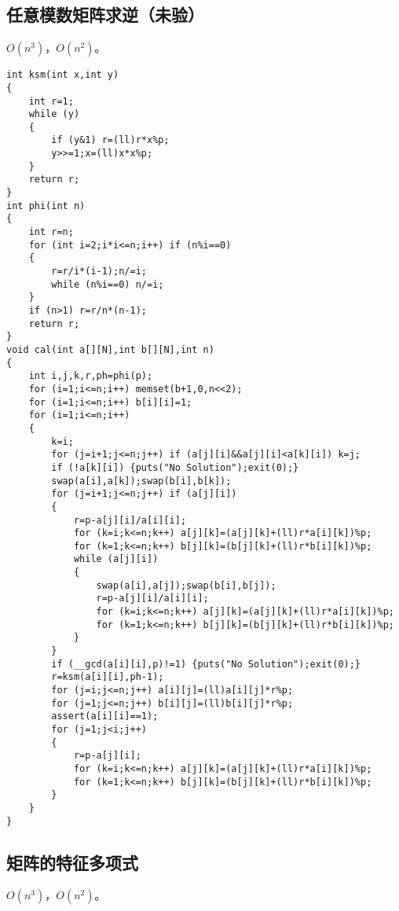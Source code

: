 \documentclass[12pt]{ctexart}
\begin{document}
\subsection{任意模数矩阵求逆（未验）}

$O(n^3)$，$O(n^2)$。

\begin{lstlisting}
int ksm(int x,int y)
{
	int r=1;
	while (y)
	{
		if (y&1) r=(ll)r*x%p;
		y>>=1;x=(ll)x*x%p;
	}
	return r;
}
int phi(int n)
{
	int r=n;
	for (int i=2;i*i<=n;i++) if (n%i==0)
	{
		r=r/i*(i-1);n/=i;
		while (n%i==0) n/=i;
	}
	if (n>1) r=r/n*(n-1);
	return r;
}
void cal(int a[][N],int b[][N],int n)
{
	int i,j,k,r,ph=phi(p);
	for (i=1;i<=n;i++) memset(b+1,0,n<<2);
	for (i=1;i<=n;i++) b[i][i]=1;
	for (i=1;i<=n;i++)
	{
		k=i;
		for (j=i+1;j<=n;j++) if (a[j][i]&&a[j][i]<a[k][i]) k=j;
		if (!a[k][i]) {puts("No Solution");exit(0);}
		swap(a[i],a[k]);swap(b[i],b[k]);
		for (j=i+1;j<=n;j++) if (a[j][i])
		{
			r=p-a[j][i]/a[i][i];
			for (k=i;k<=n;k++) a[j][k]=(a[j][k]+(ll)r*a[i][k])%p;
			for (k=1;k<=n;k++) b[j][k]=(b[j][k]+(ll)r*b[i][k])%p;
			while (a[j][i])
			{
				swap(a[i],a[j]);swap(b[i],b[j]);
				r=p-a[j][i]/a[i][i];
				for (k=i;k<=n;k++) a[j][k]=(a[j][k]+(ll)r*a[i][k])%p;
				for (k=1;k<=n;k++) b[j][k]=(b[j][k]+(ll)r*b[i][k])%p;
			}
		}
		if (__gcd(a[i][i],p)!=1) {puts("No Solution");exit(0);}
		r=ksm(a[i][i],ph-1);
		for (j=i;j<=n;j++) a[i][j]=(ll)a[i][j]*r%p;
		for (j=1;j<=n;j++) b[i][j]=(ll)b[i][j]*r%p;
		assert(a[i][i]==1);
		for (j=1;j<i;j++)
		{
			r=p-a[j][i];
			for (k=i;k<=n;k++) a[j][k]=(a[j][k]+(ll)r*a[i][k])%p;
			for (k=1;k<=n;k++) b[j][k]=(b[j][k]+(ll)r*b[i][k])%p;
		}
	}
}
\end{lstlisting}

\subsection{矩阵的特征多项式}

$O(n^3)$，$O(n^2)$。
\end{document}
